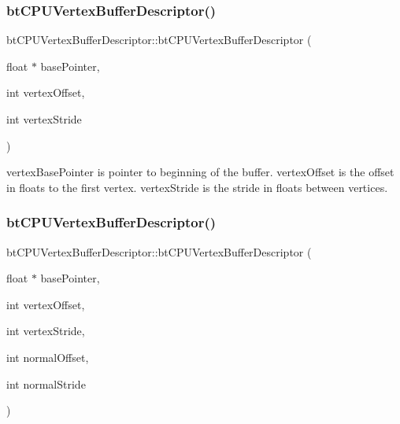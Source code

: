 \subsubsection{\texorpdfstring{bt\+C\+P\+U\+Vertex\+Buffer\+Descriptor()}{btCPUVertexBufferDescriptor()}\hspace{0.1cm}{\footnotesize\ttfamily [1/2]}}
{\footnotesize\ttfamily bt\+C\+P\+U\+Vertex\+Buffer\+Descriptor\+::bt\+C\+P\+U\+Vertex\+Buffer\+Descriptor (\begin{DoxyParamCaption}\item[{float $\ast$}]{base\+Pointer,  }\item[{int}]{vertex\+Offset,  }\item[{int}]{vertex\+Stride }\end{DoxyParamCaption})\hspace{0.3cm}{\ttfamily [inline]}}

vertex\+Base\+Pointer is pointer to beginning of the buffer. vertex\+Offset is the offset in floats to the first vertex. vertex\+Stride is the stride in floats between vertices. \mbox{\label{classbtCPUVertexBufferDescriptor_ac535162f5921eec33b7f179574d512d1}} 
\subsubsection{\texorpdfstring{bt\+C\+P\+U\+Vertex\+Buffer\+Descriptor()}{btCPUVertexBufferDescriptor()}\hspace{0.1cm}{\footnotesize\ttfamily [2/2]}}
{\footnotesize\ttfamily bt\+C\+P\+U\+Vertex\+Buffer\+Descriptor\+::bt\+C\+P\+U\+Vertex\+Buffer\+Descriptor (\begin{DoxyParamCaption}\item[{float $\ast$}]{base\+Pointer,  }\item[{int}]{vertex\+Offset,  }\item[{int}]{vertex\+Stride,  }\item[{int}]{normal\+Offset,  }\item[{int}]{normal\+Stride }\end{DoxyParamCaption})\hspace{0.3cm}{\ttfamily [inline]}}

